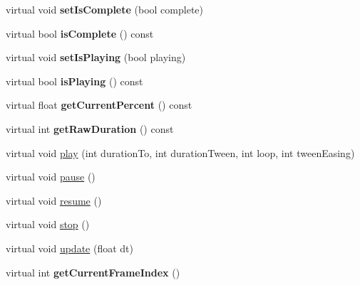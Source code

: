 \begin{DoxyCompactItemize}
virtual void {\bfseries set\+Is\+Complete} (bool complete)
\item 
\mbox{\label{classcocostudio_1_1ProcessBase_a23ccca7052abb953007b17fbb5f72100}} 
virtual bool {\bfseries is\+Complete} () const
\item 
\mbox{\label{classcocostudio_1_1ProcessBase_a8131322fec05e3d33c4fd65a4e508df5}} 
virtual void {\bfseries set\+Is\+Playing} (bool playing)
\item 
\mbox{\label{classcocostudio_1_1ProcessBase_aaffccbfe71cce933a3d332c6b53bee2c}} 
virtual bool {\bfseries is\+Playing} () const
\item 
\mbox{\label{classcocostudio_1_1ProcessBase_ae82a09a23c1fa9a01758cdae7a766abd}} 
virtual float {\bfseries get\+Current\+Percent} () const
\item 
\mbox{\label{classcocostudio_1_1ProcessBase_a6897ad61d67388f1a611c20a0302206e}} 
virtual int {\bfseries get\+Raw\+Duration} () const
\item 
virtual void \hyperlink{classcocostudio_1_1ProcessBase_ab6c48b9459dc79480b97ba15b1f2da9e}{play} (int duration\+To, int duration\+Tween, int loop, int tween\+Easing)
\item 
virtual void \hyperlink{classcocostudio_1_1ProcessBase_afdf802e606440dd57daab7d08ed620e1}{pause} ()
\item 
virtual void \hyperlink{classcocostudio_1_1ProcessBase_a0e30744d874e0332e156318d21abaa5a}{resume} ()
\item 
virtual void \hyperlink{classcocostudio_1_1ProcessBase_a7e4cb3dd6ab91ba5a9db51594d1e613a}{stop} ()
\item 
virtual void \hyperlink{classcocostudio_1_1ProcessBase_aa58567e485c4ff5f4f9e306816ca6864}{update} (float dt)
\item 
\mbox{\label{classcocostudio_1_1ProcessBase_a91252e76bf3fa56bba918f76a4acca37}} 
virtual int {\bfseries get\+Current\+Frame\+Index} ()
\item 
\mbox{\label{classcocostudio_1_1ProcessBase_a87c877d0c89e7f2c0d9111936cfed7f5}} 

\end{DoxyCompactItemize}

